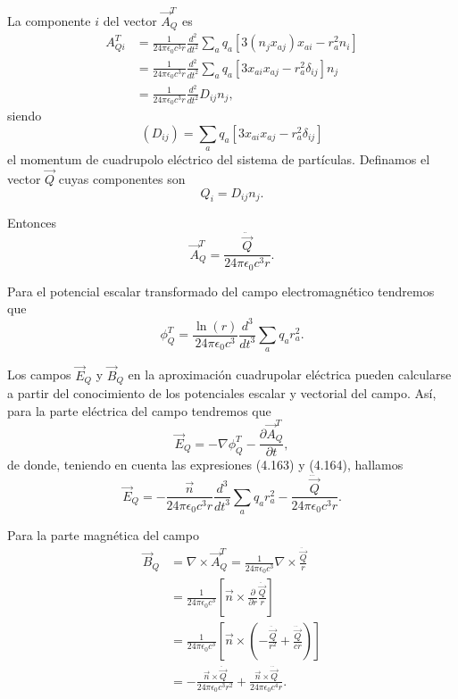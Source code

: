 \documentclass[12pt,a4paper]{book}
\begin{document}
La componente $i$ del vector $\vec{A}_Q^T$ es
\begin{align}
A_{Qi}^T &= \frac{1}{24\pi\epsilon_0 c^3 r}\frac{d^2}{dt^2}\sum_a q_a [3(n_j x_{aj})x_{ai} - r_a^2 n_i] \nonumber \\
&= \frac{1}{24\pi\epsilon_0 c^3 r}\frac{d^2}{dt^2}\sum_a q_a [3x_{ai}x_{aj} - r_a^2\delta_{ij}]n_j \nonumber \\
&= \frac{1}{24\pi\epsilon_0 c^3 r}\frac{d^2}{dt^2}D_{ij}n_j,
\end{align}
siendo
\begin{equation}
(D_{ij}) = \sum_a q_a [3x_{ai}x_{aj} - r_a^2\delta_{ij}]
\end{equation}
el momentum de cuadrupolo eléctrico del sistema de partículas. Definamos el vector $\vec{Q}$ cuyas componentes son
\begin{equation}
Q_i = D_{ij}n_j.
\end{equation}

Entonces
\begin{equation}
\vec{A}_Q^T = \frac{\ddot{\vec{Q}}}{24\pi\epsilon_0 c^3 r}.
\end{equation}

Para el potencial escalar transformado del campo electromagnético tendremos que
\begin{equation}
\phi_Q^T = \frac{\ln(r)}{24\pi\epsilon_0c^3}\frac{d^3}{dt^3}\sum_a q_a r_a^2.
\end{equation}

Los campos $\vec{E}_Q$ y $\vec{B}_Q$ en la aproximación cuadrupolar eléctrica pueden calcularse a partir del conocimiento de los potenciales escalar y vectorial del campo. Así, para la parte eléctrica del campo tendremos que
\begin{equation}
\vec{E}_Q = -\nabla\phi_Q^T - \frac{\partial \vec{A}_Q^T}{\partial t},
\end{equation}
de donde, teniendo en cuenta las expresiones (4.163) y (4.164), hallamos
\begin{equation}
\vec{E}_Q = -\frac{\vec{n}}{24\pi\epsilon_0 c^3 r}\frac{d^3}{dt^3}\sum_a q_a r_a^2 - \frac{\dddot{\vec{Q}}}{24\pi\epsilon_0 c^3r}.
\end{equation}

Para la parte magnética del campo
\begin{align}
\vec{B}_Q &= \nabla\times \vec{A}_Q^T = \frac{1}{24\pi\epsilon_0c^3}\nabla\times\frac{\ddot{\vec{Q}}}{r} \nonumber \\
&= \frac{1}{24\pi\epsilon_0 c^3}\left[\vec{n} \times \frac{\partial}{\partial r}\frac{\ddot{\vec{Q}}}{r}\right] \nonumber \\
&= \frac{1}{24\pi\epsilon_0 c^3}\left[\vec{n} \times \left(-\frac{\ddot{\vec{Q}}}{r^2} + \frac{\dddot{\vec{Q}}}{cr}\right)\right] \nonumber \\
&= -\frac{\vec{n} \times \ddot{\vec{Q}}}{24\pi\epsilon_0c^3 r^2} + \frac{\vec{n} \times \dddot{\vec{Q}}}{24\pi\epsilon_0c^4 r}.
\end{align}
\end{document}
